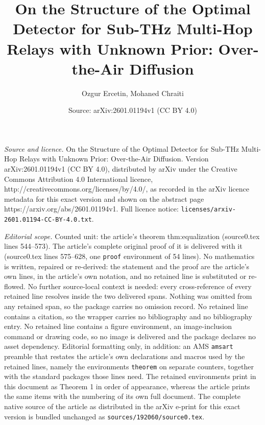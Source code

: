 \documentclass[10pt,a4paper]{amsart}
\title{On the Structure of the Optimal Detector for Sub-THz Multi-Hop Relays with Unknown Prior: Over-the-Air Diffusion}
\author{Ozgur Ercetin, Mohaned Chraiti}
\date{Source: arXiv:2601.01194v1 (CC BY 4.0)}
\begin{document}
\maketitle

\noindent\emph{Source and licence.} On the Structure of the Optimal Detector for Sub-THz Multi-Hop Relays with Unknown Prior: Over-the-Air Diffusion. Version arXiv:2601.01194v1 (CC BY 4.0), distributed by arXiv under the Creative Commons Attribution 4.0 International licence, http://creativecommons.org/licenses/by/4.0/, as recorded in the arXiv licence metadata for this exact version and shown on the abstract page https://arxiv.org/abs/2601.01194v1. Full licence notice: \texttt{licenses/arxiv-2601.01194-CC-BY-4.0.txt}.\par\smallskip

\noindent\textit{Editorial scope.} Counted unit: the article's theorem thm:equalization (source0.tex lines 544--573). The article's complete original proof of it is delivered with it (source0.tex lines 575--628, one \texttt{proof} environment of 54 lines). No mathematics is written, repaired or re-derived: the statement and the proof are the article's own lines, in the article's own notation, and no retained line is substituted or re-flowed.  No further source-local context is needed: every cross-reference of every retained line resolves inside the two delivered spans.  Nothing was omitted from any retained span, so the package carries no omission record.  No retained line contains a citation, so the wrapper carries no bibliography and no bibliography entry.  No retained line contains a figure environment, an image-inclusion command or drawing code, so no image is delivered and the package declares no asset dependency.  Editorial formatting only, in addition: an AMS \texttt{amsart} preamble that restates the article's own declarations and macros used by the retained lines, namely the environments \texttt{theorem} on separate counters, together with the standard packages those lines need.  The retained environments print in this document as Theorem 1 in order of appearance, whereas the article prints the same items with the numbering of its own full document.  The complete native source of the article as distributed in the arXiv e-print for this exact version is bundled unchanged as \texttt{sources/192060/source0.tex}.
\end{document}
